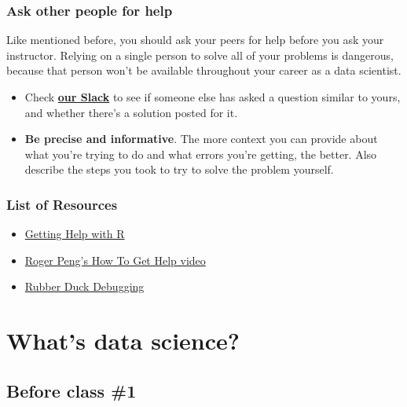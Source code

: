 \documentclass[
]{book}
\providecommand{\tightlist}{%
  \setlength{\itemsep}{0pt}\setlength{\parskip}{0pt}}
\begin{document}
\hypertarget{ask-other-people-for-help}{%
\subsection{Ask other people for help}\label{ask-other-people-for-help}}

Like mentioned before, you should ask your peers for help before you ask your instructor. Relying on a single person to solve all of your problems is dangerous, because that person won't be available throughout your career as a data scientist.

\begin{itemize}
\item
  Check \href{https://ischool-esoc214.slack.com}{\textbf{our Slack}} to see if someone else has asked a question similar to yours, and whether there's a solution posted for it.
\item
  \textbf{Be precise and informative}. The more context you can provide about what you're trying to do and what errors you're getting, the better. Also describe the steps you took to try to solve the problem yourself.
\end{itemize}

\hypertarget{list-of-resources}{%
\subsection{List of Resources}\label{list-of-resources}}

\begin{itemize}
\tightlist
\item
  \href{https://www.r-project.org/help.html}{Getting Help with R}
\item
  \href{https://www.youtube.com/watch?v=ZFaWxxzouCY\&feature=youtu.be}{Roger Peng's How To Get Help video}
\item
  \href{https://rubberduckdebugging.com/}{Rubber Duck Debugging}
\end{itemize}

\hypertarget{whats_ds}{%
\chapter{What's data science?}\label{whats_ds}}

\hypertarget{before-class-1}{%
\section{Before class \#1}\label{before-class-1}}
\end{document}
